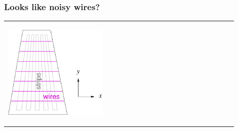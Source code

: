 \documentclass[compress]{beamer}
\begin{document}
\begin{frame}
\frametitle{Looks like noisy wires?}
\begin{center}
\begin{tabular}{p{0.4\linewidth} p{0.5\linewidth}}
\begin{minipage}{\linewidth}
\begin{center}
\includegraphics[width=0.85\linewidth]{orientations.pdf}


\end{center}
\end{minipage}
\end{tabular}
\end{center}
\end{frame}
\end{document}
